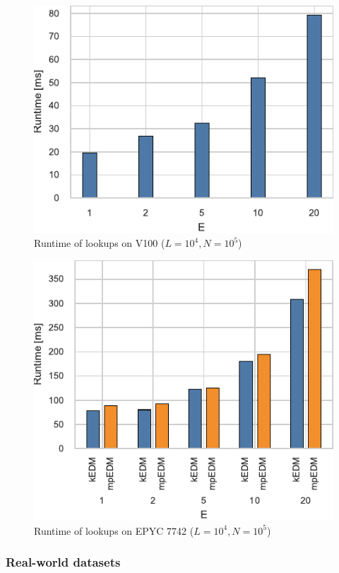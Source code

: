 \documentclass[conference]{IEEEtran}
\begin{document}
\begin{figure}
    \centering
    \includegraphics{figs/runtime_lookup_v100}
    \caption{Runtime of lookups on V100 ($L=10^4, N=10^5$)}%
    \label{fig:breakdown-lookup-v100}
\end{figure}

\begin{figure}
    \centering
    \includegraphics{figs/runtime_lookup_epyc}
    \caption{Runtime of lookups on EPYC 7742 ($L=10^4, N=10^5$)}%
    \label{fig:breakdown-lookup-epyc}
\end{figure}

\subsubsection{Real-world datasets}
\end{document}
